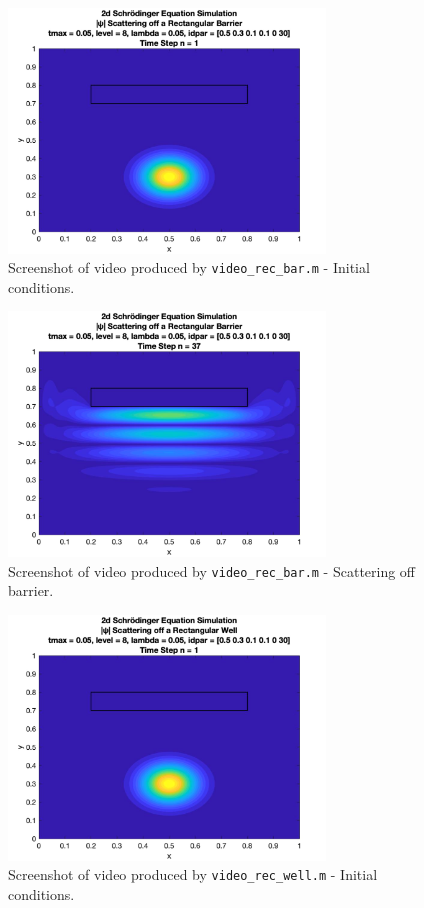 \documentclass[10pt]{article}
\def\code#1{\texttt{#1}} %
\begin{document}

\begin{figure}[H]
\centering
\includegraphics[width=0.75\textwidth]{problem2/rec_bar_1.png}
\caption{Screenshot of video produced by \code{video\_rec\_bar.m} - Initial conditions.}
\end{figure}

\begin{figure}[H]
\centering
\includegraphics[width=0.75\textwidth]{problem2/rec_bar_2.png}
\caption{Screenshot of video produced by \code{video\_rec\_bar.m} - Scattering off barrier.}
\end{figure}

\begin{figure}[H]
\centering
\includegraphics[width=0.75\textwidth]{problem2/rec_well_1.png}
\caption{Screenshot of video produced by \code{video\_rec\_well.m} - Initial conditions.}
\end{figure}
\end{document}

